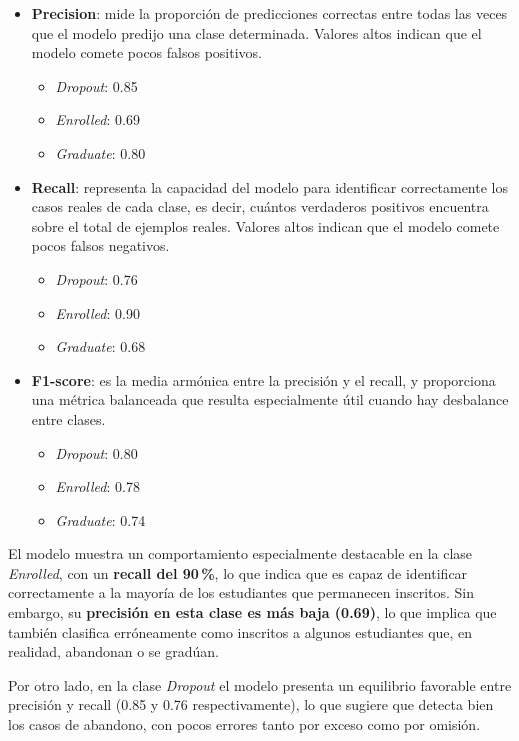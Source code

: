 \documentclass{report}[14pt]
\begin{document}
\begin{itemize}
  \item \textbf{Precision}: mide la proporción de predicciones correctas entre todas las veces que el modelo predijo una clase determinada. Valores altos indican que el modelo comete pocos falsos positivos.
  \begin{itemize}
    \item \textit{Dropout}: 0.85
    \item \textit{Enrolled}: 0.69
    \item \textit{Graduate}: 0.80
  \end{itemize}
  
  \item \textbf{Recall}: representa la capacidad del modelo para identificar correctamente los casos reales de cada clase, es decir, cuántos verdaderos positivos encuentra sobre el total de ejemplos reales. Valores altos indican que el modelo comete pocos falsos negativos.
  \begin{itemize}
    \item \textit{Dropout}: 0.76
    \item \textit{Enrolled}: 0.90
    \item \textit{Graduate}: 0.68
  \end{itemize}
  
  \item \textbf{F1-score}: es la media armónica entre la precisión y el recall, y proporciona una métrica balanceada que resulta especialmente útil cuando hay desbalance entre clases.
  \begin{itemize}
    \item \textit{Dropout}: 0.80
    \item \textit{Enrolled}: 0.78
    \item \textit{Graduate}: 0.74
  \end{itemize}
\end{itemize}

El modelo muestra un comportamiento especialmente destacable en la clase \textit{Enrolled}, con un \textbf{recall del 90\,\%}, lo que indica que es capaz de identificar correctamente a la mayoría de los estudiantes que permanecen inscritos. Sin embargo, su \textbf{precisión en esta clase es más baja (0.69)}, lo que implica que también clasifica erróneamente como inscritos a algunos estudiantes que, en realidad, abandonan o se gradúan.

Por otro lado, en la clase \textit{Dropout} el modelo presenta un equilibrio favorable entre precisión y recall (0.85 y 0.76 respectivamente), lo que sugiere que detecta bien los casos de abandono, con pocos errores tanto por exceso como por omisión.
\end{document}
